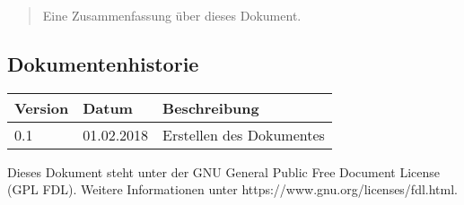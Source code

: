 \maketitle
\begin{abstract}
    Eine Zusammenfassung über dieses Dokument.
\end{abstract}

\subsection*{Dokumentenhistorie}
\begin{center}
    \begin{tabularx}{.9\textwidth}{llX}
        \toprule
        \textbf{Version} & \textbf{Datum} & \textbf{Beschreibung} \\
        \midrule
        0.1 & 01.02.2018 & Erstellen des Dokumentes \\
        \bottomrule
    \end{tabularx}
\end{center}

\vfill

\footnotesize{Dieses Dokument steht unter der GNU General Public Free Document License (GPL FDL). Weitere Informationen unter https://www.gnu.org/licenses/fdl.html.}
\clearpage